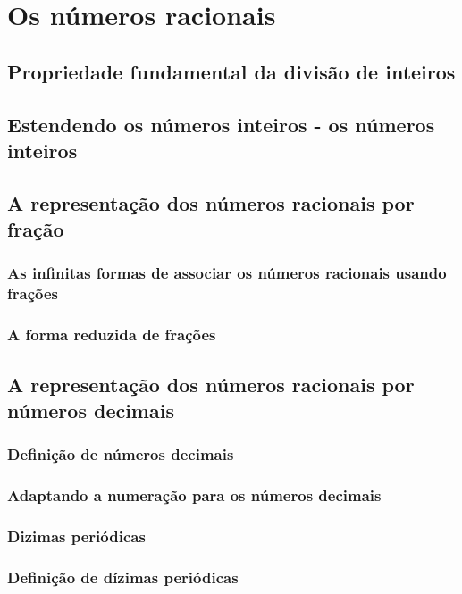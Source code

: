\chapter[Os números racionais]{Os números racionais}

\section{Propriedade fundamental da divisão de inteiros}

\section{Estendendo os números inteiros - os números inteiros}

\section{A representação dos números racionais por fração}

\subsection{As infinitas formas de associar os números racionais usando frações}

\subsection{A forma reduzida de frações}

\section{A representação dos números racionais por números decimais}

\subsection{Definição de números decimais}

\subsection{Adaptando a numeração para os números decimais}

\subsection{Dizimas periódicas}

\subsection{Definição de dízimas periódicas}

